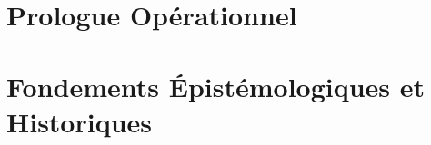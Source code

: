 \documentclass[12pt, twoside, openright, a4paper]{book}
\begin{document}
\frontmatter

    
    \cleardoublepage

    
    \cleardoublepage

    
    \cleardoublepage

    \tableofcontents
    \cleardoublepage

    \listoffigures
    \listoftables
    \cleardoublepage

\mainmatter

    \part{Prologue Opérationnel}
    \label{part:prologue}

        
    
    \part{Fondements Épistémologiques et Historiques}
    \label{part:fondements}

        
       
        
      
        
       
        
      
\end{document}
